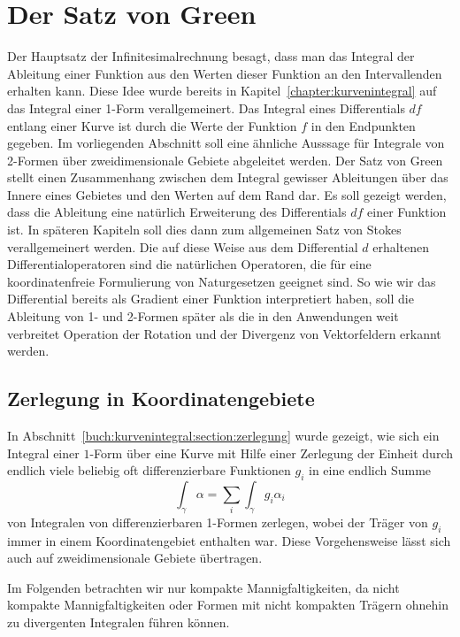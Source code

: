 %
%
\section{Der Satz von Green
\label{buch:green:section:green}}
Der Hauptsatz der Infinitesimalrechnung besagt, dass man das Integral
%
der Ableitung einer Funktion aus den Werten dieser Funktion
an den Intervallenden erhalten kann.
Diese Idee wurde bereits in Kapitel~\ref{chapter:kurvenintegral} auf
das Integral einer 1-Form verallgemeinert.
Das Integral eines Differentials $df$ entlang einer Kurve ist durch
die Werte der Funktion $f$ in den Endpunkten gegeben.
Im vorliegenden Abschnitt soll eine ähnliche Ausssage für Integrale
von 2-Formen über zweidimensionale Gebiete abgeleitet werden.
Der Satz von Green stellt einen Zusammenhang zwischen dem Integral
gewisser Ableitungen über das Innere eines Gebietes und den Werten
auf dem Rand dar.
Es soll gezeigt werden, dass die Ableitung eine natürlich Erweiterung
des Differentials $df$ einer Funktion ist.
In späteren Kapiteln soll dies dann zum allgemeinen Satz von Stokes
verallgemeinert werden.
%
Die auf diese Weise aus dem Differential $d$ erhaltenen
Differentialoperatoren sind die natürlichen Operatoren, die für
eine koordinatenfreie Formulierung von Naturgesetzen geeignet sind.
So wie wir das Differential bereits als Gradient einer Funktion
interpretiert haben, soll die Ableitung von 1- und 2-Formen später
als die in den Anwendungen weit verbreitet Operation der Rotation
und der Divergenz von Vektorfeldern erkannt werden.

%
%
\subsection{Zerlegung in Koordinatengebiete
\label{buch:green:satzvongreen:subsection:zerlegung}}
In Abschnitt~\ref{buch:kurvenintegral:section:zerlegung} wurde gezeigt,
wie sich ein Integral einer $1$-Form über eine Kurve mit Hilfe einer
Zerlegung der Einheit durch endlich viele beliebig oft differenzierbare
Funktionen $g_i$ in eine endlich Summe
\[
\int_{\gamma} \alpha = \sum_i \int_{\gamma} g_i\alpha_i
\]
von Integralen von differenzierbaren 1-Formen zerlegen, wobei der
Träger von $g_i$ immer in einem Koordinatengebiet enthalten war.
Diese Vorgehensweise lässt sich auch auf zweidimensionale Gebiete
übertragen.

Im Folgenden betrachten wir nur kompakte Mannigfaltigkeiten, da nicht
kompakte Mannigfaltigkeiten oder Formen mit nicht kompakten Trägern
ohnehin zu divergenten Integralen führen können.

